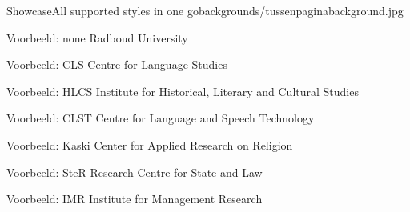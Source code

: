\documentclass[department=softwarescience, notes={show notes}, slidesperpage=4, handout, official=true]{beamerruhuisstijl}
\begin{document}

\begin{tussenpagina}{Showcase}{All supported styles in one go}{backgrounds/tussenpaginabackground.jpg}
\end{tussenpagina}
\note{}

\renewcommand{\dept}{none}
\begin{frame}
    \titlepage
\end{frame}
\begin{frame}{Voorbeeld: none}
	Radboud University
\end{frame}

\renewcommand{\dept}{cls}
\begin{frame}
    \titlepage
\end{frame}
\begin{frame}{Voorbeeld: CLS}
	Centre for Language Studies
\end{frame}

\renewcommand{\dept}{hlcs}
\begin{frame}
    \titlepage
\end{frame}
\begin{frame}{Voorbeeld: HLCS}
	Institute for Historical, Literary and Cultural Studies
\end{frame}

\renewcommand{\dept}{clst}
\begin{frame}
    \titlepage
\end{frame}
\begin{frame}{Voorbeeld: CLST}
	Centre for Language and Speech Technology
\end{frame}

\renewcommand{\dept}{kaski}
\begin{frame}
    \titlepage
\end{frame}
\begin{frame}{Voorbeeld: Kaski}
	Center for Applied Research on Religion
\end{frame}

\renewcommand{\dept}{ster}
\begin{frame}
    \titlepage
\end{frame}
\begin{frame}{Voorbeeld: SteR}
	Research Centre for State and Law
\end{frame}

\renewcommand{\dept}{imr}
\begin{frame}
    \titlepage
\end{frame}
\begin{frame}{Voorbeeld: IMR}
	Institute for Management Research
\end{frame}
\end{document}
